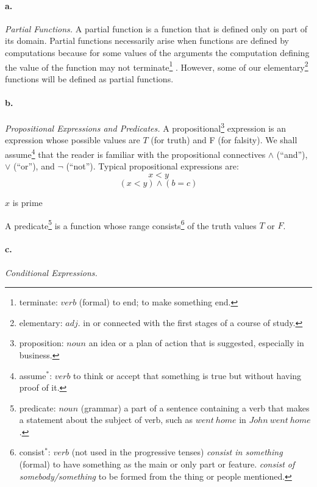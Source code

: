 \documentclass[11pt, a4paper]{article}
\begin{document}
\paragraph{a.}\textit{Partial Functions.}
A partial function is a function that is defined only on part of its
domain. Partial functions necessarily arise when functions are defined by
computations because for some values of the arguments the computation defining
the value of the function may not
terminate\footnote{terminate: $verb$ (formal) to end; to make something end.}
. However, some of our
elementary\footnote{elementary: $adj.$ in or connected with the first stages of
  a course of study.}
functions will be defined as partial functions.

\paragraph{b.}\textit{Propositional Expressions and Predicates.}
A
propositional\footnote{proposition: $noun$ an idea or a plan of action that is
  suggested, especially in business.}
expression is an expression whose possible values are $T$ (for
truth) and F (for falsity). We shall
assume\footnote{assume$^*$: $verb$ to think or accept that something is true but
  without having proof of it.}
that the reader is familiar with the
propositional connectives $\land$ (``and''), $\lor$ (``or''), and $\lnot$
(``not''). Typical propositional expressions are:
$$ x < y $$
$$ (x < y) \land (b = c)  $$
\begin{center}$x$ is prime\end{center}

A
predicate\footnote{predicate: $noun$ (grammar) a part of a sentence containing a
  verb that makes a statement about the subject of verb, such as $went \ home$
  in $John \ went \ home$.}
is a function whose range
consists\footnote{consist$^*$: $verb$ (not used in the progressive tenses)
  \textit{consist in something} (formal) to have something as the main or only
  part or feature. \textit{consist of somebody/something} to be formed from the
  thing or people mentioned.}
of the truth values $T$ or $F$.

\paragraph{c.}\textit{Conditional Expressions.}
\end{document}
